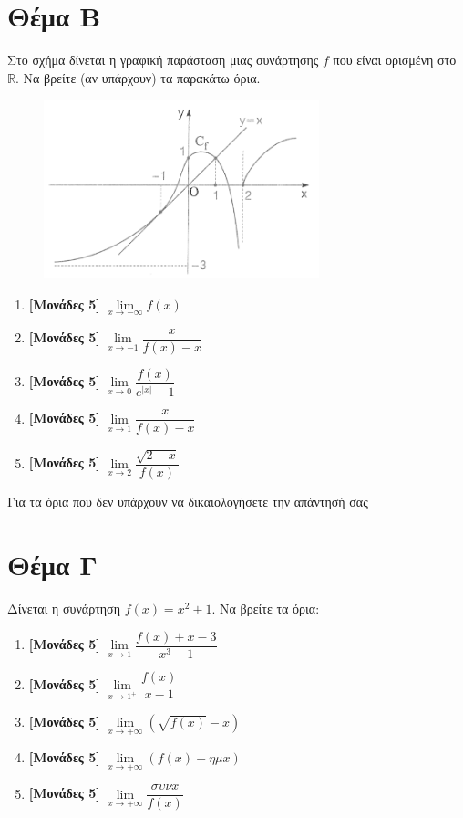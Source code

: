 \documentclass[12pt]{article}
\begin{document}
\section*{Θέμα Β}
  \noindent
  Στο σχήμα δίνεται η γραφική παράσταση μιας συνάρτησης $f$ που είναι ορισμένη στο $\mathbb{R}$. Να βρείτε (αν υπάρχουν) τα παρακάτω όρια.
  \begin{figure}[h]
    \includegraphics[width=8cm]{oriatest.png}
    \centering
    \end{figure}
  \begin{enumerate}
    \item \textbf{[Μονάδες 5]} $\lim\limits_{x \to -\infty}{ f(x) }$
    \item \textbf{[Μονάδες 5]} $\lim\limits_{x \to -1}{ \dfrac{x}{f(x)-x} }$
    \item \textbf{[Μονάδες 5]} $\lim\limits_{x \to 0}{ \dfrac{f(x)}{e^{|x|}-1} }$
    \item \textbf{[Μονάδες 5]} $\lim\limits_{x \to 1}{ \dfrac{x}{f(x)-x} }$
    \item \textbf{[Μονάδες 5]} $\lim\limits_{x \to 2}{ \dfrac{\sqrt{2-x}}{f(x)} }$
  \end{enumerate}
  Για τα όρια που δεν υπάρχουν να δικαιολογήσετε την απάντησή σας

\section*{Θέμα Γ}
  \noindent
  Δίνεται η συνάρτηση $f(x)=x^2+1$. Να βρείτε τα όρια:
  \begin{enumerate}
    \item \textbf{[Μονάδες 5]} $\lim\limits_{x \to 1}{ \dfrac{f(x)+x-3}{x^3-1} }$
    \item \textbf{[Μονάδες 5]} $\lim\limits_{x \to 1^+}{ \dfrac{f(x)}{x-1} }$
    \item \textbf{[Μονάδες 5]} $\lim\limits_{x \to +\infty}{ \left( \sqrt{f(x)}-x \right)}$   
    \item \textbf{[Μονάδες 5]} $\lim\limits_{x \to +\infty}{ \left( f(x)+ημx \right)}$
    \item \textbf{[Μονάδες 5]} $\lim\limits_{x \to +\infty}{ \dfrac{συνx}{f(x)}}$
  \end{enumerate}
\end{document}
